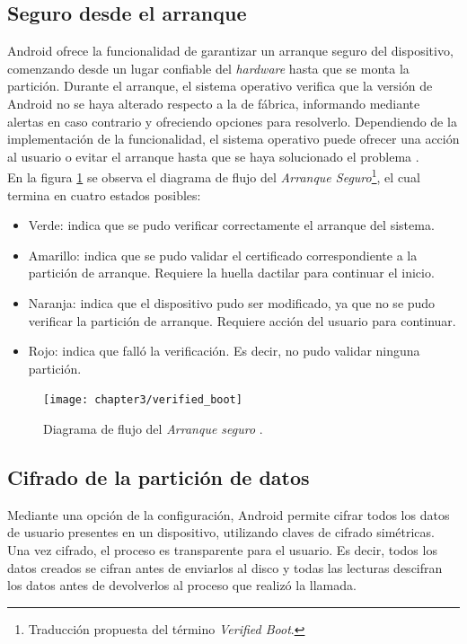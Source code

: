 \subsection{Seguro desde el arranque}\label{fig:ch03:verify-boot}
Android ofrece la funcionalidad de garantizar un arranque seguro del dispositivo, comenzando desde un lugar confiable del \textit{hardware} hasta que se monta la partición. Durante el arranque, el sistema operativo verifica que la versión de Android no se haya alterado respecto a la de fábrica, informando mediante alertas en caso contrario y ofreciendo opciones para resolverlo. Dependiendo de la implementación de la funcionalidad, el sistema operativo puede ofrecer una acción al usuario o evitar el arranque hasta que se haya solucionado el problema \cite{aossec}.\\

En la figura \ref{fig:ch03:verifyBoot} se observa el diagrama de flujo del \textit{Arranque Seguro}\footnote{Traducción propuesta del término \textit{Verified Boot}.}, el cual termina en cuatro estados posibles:
\begin{itemize}
	\item Verde: indica que se pudo verificar correctamente el arranque del sistema.
	\item Amarillo: indica que se pudo validar el certificado correspondiente a la partición de arranque. Requiere la huella dactilar para continuar el inicio.
	\item Naranja: indica que el dispositivo pudo ser modificado, ya que no se pudo verificar la partición de arranque. Requiere acción del usuario para continuar.
	\item Rojo: indica que falló la verificación. Es decir, no pudo validar ninguna partición.
\end{itemize}
\begin{figure}[htbp]
	\begin{center}
		\texttt{[image: chapter3/verified\_boot]}
		\caption{Diagrama de flujo del \textit{Arranque seguro} \cite{asreview2015}.}
		\label{fig:ch03:verifyBoot}
	\end{center}
\end{figure}
\subsection{Cifrado de la partición de datos}
Mediante una opción de la configuración, Android permite cifrar todos los datos de usuario presentes en un dispositivo, utilizando claves de cifrado simétricas. Una vez cifrado, el proceso es transparente para el usuario. Es decir, todos los datos creados se cifran antes de enviarlos al disco y todas las lecturas descifran los datos antes de devolverlos al proceso que realizó la llamada.\\

